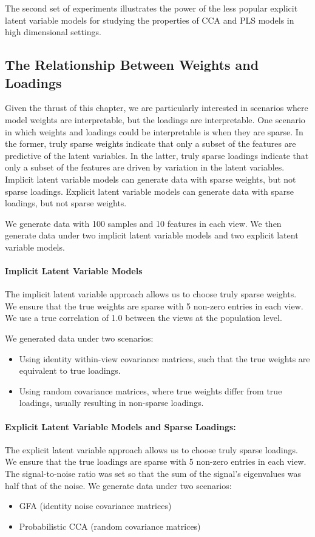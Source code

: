 The second set of experiments illustrates the power of the less popular explicit latent variable models for studying the properties of CCA and PLS models in high dimensional settings.

\subsection{The Relationship Between Weights and Loadings}

Given the thrust of this chapter, we are particularly interested in scenarios where model weights are interpretable, but the \gls{loadings} are interpretable.
One scenario in which weights and loadings could be interpretable is when they are sparse.
In the former, truly sparse weights indicate that only a subset of the features are predictive of the latent variables.
In the latter, truly sparse \gls{loadings} indicate that only a subset of the features are driven by variation in the latent variables.
Implicit latent variable models can generate data with sparse weights, but not sparse \gls{loadings}.
Explicit latent variable models can generate data with sparse \gls{loadings}, but not sparse weights.

We generate data with 100 samples and 10 features in each view.
We then generate data under two implicit latent variable models and two explicit latent variable models.

\paragraph{Implicit Latent Variable Models}
The implicit latent variable approach allows us to choose truly sparse weights.
We ensure that the true weights are sparse with 5 non-zero entries in each view.
We use a true correlation of 1.0 between the views at the population level.

We generated data under two scenarios:
\begin{itemize}
    \item Using identity within-view covariance matrices, such that the true weights are equivalent to true loadings.
    \item Using random covariance matrices, where true weights differ from true loadings, usually resulting in non-sparse loadings.
\end{itemize}

\paragraph{Explicit Latent Variable Models and Sparse Loadings:}
The explicit latent variable approach allows us to choose truly sparse \gls{loadings}.
We ensure that the true \gls{loadings} are sparse with 5 non-zero entries in each view.
The signal-to-noise ratio was set so that the sum of the signal's eigenvalues was half that of the noise.
We generate data under two scenarios:
\begin{itemize}
    \item GFA (identity noise covariance matrices)
    \item Probabilistic CCA (random covariance matrices)
\end{itemize}

